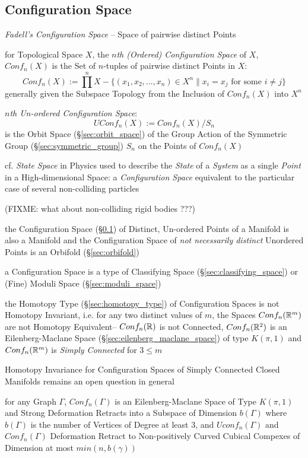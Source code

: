 \subsection{Configuration Space}\label{sec:configuration_space}

\emph{Fadell's Configuration Space} -- Space of pairwise distinct Points

for Topological Space $X$, the \emph{$n$th (Ordered) Configuration Space} of
$X$, $Conf_n(X)$ is the Set of $n$-tuples of pairwise distinct Points in $X$:
\[
  Conf_n(X) := \prod^n X - \{(x_1, x_2, \ldots, x_n) \in X^n
    \| x_i = x_j \text{ for some } i \neq j \}
\]
generally given the Subspace Topology from the Inclusion of $Conf_n(X)$ into
$X^n$

\emph{$n$th Un-ordered Configuration Space}:
\[
  UConf_n(X) := Conf_n(X)/S_n
\]
is the Orbit Space (\S\ref{sec:orbit_space}) of the Group Action of the
Symmetric Group (\S\ref{sec:symmetric_group}) $S_n$ on the Points of $Conf_n(X)$

cf. \emph{State Space} in Physics used to describe the \emph{State} of a
\emph{System} as a single \emph{Point} in a High-dimensional Space: a
\emph{Configuration Space} equivalent to the particular case of several
non-colliding particles

(FIXME: what about non-colliding rigid bodies ???)

the Configuration Space (\S\ref{sec:configuration_space}) of Distinct,
Un-ordered Points of a Manifold is also a Manifold and the Configuration Space
of \emph{not necessarily distinct} Unordered Points is an Orbifold
(\S\ref{sec:orbifold})

a Configuration Space is a type of Classifying Space
(\S\ref{sec:classifying_space}) or (Fine) Moduli Space
(\S\ref{sec:moduli_space})

the Homotopy Type (\S\ref{sec:homotopy_type}) of Configuration Spaces is not
Homotopy Invariant, i.e. for any two distinct values of $m$, the Spaces
$Conf_n(\mathbb{R}^m)$ are not Homotopy Equivalent-- $Conf_n(\mathbb{R})$ is not
Connected, $Conf_n(\mathbb{R}^2)$ is an Eilenberg-Maclane Space
(\S\ref{sec:eilenberg_maclane_space}) of type $K(\pi,1)$ and $Conf_n(\mathbb{R}^m)$
is \emph{Simply Connected} for $3 \leq m$

Homotopy Invariance for Configuration Spaces of Simply Connected Closed
Manifolds remains an open question in general

for any Graph $\Gamma$, $Conf_n(\Gamma)$ is an Eilenberg-Maclane Space of Type
$K(\pi,1)$ and Strong Deformation Retracts into a Subspace of Dimension
$b(\Gamma)$ where $b(\Gamma)$ is the number of Vertices of Degree at least 3,
and $Uconf_n(\Gamma)$ and $Conf_n(\Gamma)$ Deformation Retract to
Non-positively Curved Cubical Compexes of Dimension at most $min(n,b(\gamma))$




